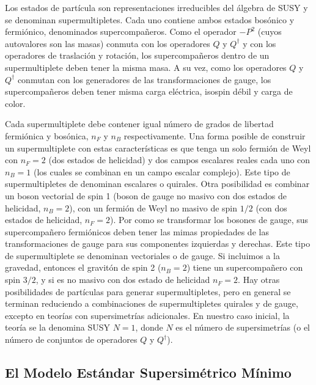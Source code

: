 Los estados de partícula son representaciones irreducibles del álgebra de SUSY y se denominan supermultipletes. Cada uno contiene ambos estados bosónico y fermiónico, denominados supercompañeros. Como el operador $-P^2$ (cuyos autovalores son las masas) conmuta con los operadores $Q$ y $Q^{\dagger}$ y con los operadores de traslación y rotación, los supercompañeros dentro de un supermultiplete deben tener la misma masa. A su vez, como los operadores $Q$ y $Q^{\dagger}$ conmutan con los generadores de las transformaciones de gauge, los supercompañeros deben tener misma carga eléctrica, isospin débil y carga de color.

Cada supermultiplete debe contener igual número de grados de libertad fermiónica y bosónica, $n_F$ y $n_B$ respectivamente. Una forma posible de construir un supermultiplete con estas características es que tenga un solo fermión de Weyl con $n_F=2$ (dos estados de helicidad) y dos campos escalares reales cada uno con $n_B=1$ (los cuales se combinan en un campo escalar complejo). Este tipo de supermultipletes de denominan escalares o quirales. Otra posibilidad es combinar un boson vectorial de spin 1 (boson de gauge no masivo con dos estados de helicidad, $n_B=2$), con un fermión de Weyl no masivo de spin $1/2$ (con dos estados de helicidad, $n_F=2$). Por como se transformar los bosones de gauge, sus supercompañero fermiónicos deben tener las mimas propiedades de las transformaciones de gauge para sus componentes izquierdas y derechas. Este tipo de supermultiplete se denominan vectoriales o de gauge. Si incluimos a la gravedad, entonces el gravitón de spin 2 ($n_B=2$) tiene un supercompañero con spin $3/2$, y si es no masivo con dos estado de helicidad $n_F=2$. Hay otras posibilidades de partículas para generar supermultipletes, pero en general se terminan reduciendo a combinaciones de supermultipletes quirales y de gauge, excepto en teorías con supersimetrías adicionales. En nuestro caso inicial, la teoría se la denomina SUSY $N=1$, donde $N$ es el número de supersimetrías (o el número de conjuntos de operadores $Q$ y $Q^{\dagger}$). 

\subsection{El Modelo Estándar Supersimétrico Mínimo}


